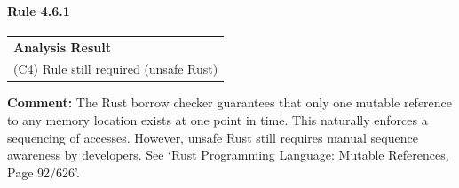 \paragraph{Rule 4.6.1}
\begin{longtable}{p{13cm}}
\textbf{Analysis Result} \\
(C4) Rule still required (unsafe Rust) \\
\end{longtable}
\textbf{Comment:} The Rust borrow checker guarantees that only one mutable reference to any memory location exists at one point in time. This naturally enforces a sequencing of accesses. However, unsafe Rust still requires manual sequence awareness by developers. See `Rust Programming Language: Mutable References, Page 92/626'. \\
